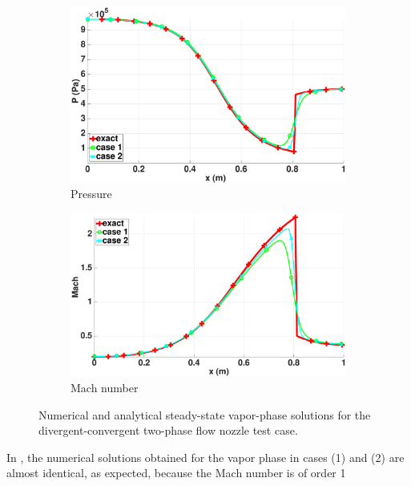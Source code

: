 \begin{figure}[H]
        \begin{subfigure}[b]{0.495\textwidth}
                \centering
                \includegraphics[width=\textwidth]{figures/vapor_pressure_llf_and_exact_100.eps}
                \caption{Pressure}
                \label{fig:vap-phase-press}
        \end{subfigure}        
        \begin{subfigure}[b]{0.495\textwidth}
                \centering
                \includegraphics[width=\textwidth]{figures/vapor_mach_llf_and_exact_100.eps}
                \caption{Mach number}
                \label{fig:vap-phase-mach}
        \end{subfigure}
        \caption{Numerical and analytical steady-state vapor-phase solutions for the divergent-convergent two-phase flow nozzle test case.}\label{fig:vap-phase}
\end{figure}
%
In , the numerical solutions obtained for the vapor phase in cases (1) and (2) are almost identical, as expected, because the Mach number is of order 1
